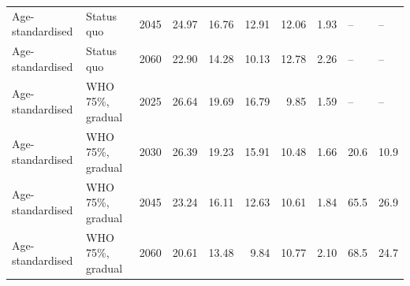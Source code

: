 \begin{longtable}{llrrrrrrll}
Age-standardised & Status quo & 2045 & 24.97 & 16.76 & 12.91 & 12.06 & 1.93 & -- & -- \\
Age-standardised & Status quo & 2060 & 22.90 & 14.28 & 10.13 & 12.78 & 2.26 & -- & -- \\
Age-standardised & WHO 75\%, gradual & 2025 & 26.64 & 19.69 & 16.79 & 9.85 & 1.59 & -- & -- \\
Age-standardised & WHO 75\%, gradual & 2030 & 26.39 & 19.23 & 15.91 & 10.48 & 1.66 & 20.6 & 10.9 \\
Age-standardised & WHO 75\%, gradual & 2045 & 23.24 & 16.11 & 12.63 & 10.61 & 1.84 & 65.5 & 26.9 \\
Age-standardised & WHO 75\%, gradual & 2060 & 20.61 & 13.48 & 9.84 & 10.77 & 2.10 & 68.5 & 24.7 \\
\end{longtable}
\normalsize
